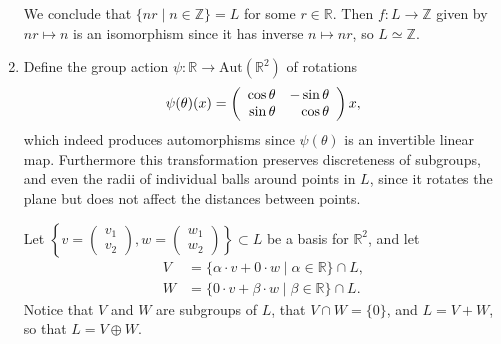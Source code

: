\documentclass{article}
\begin{document}
\begin{Answer}
\begin{enumerate}
{      We conclude that $\{ n r \mid n \in \mathbb{Z} \} = L$ for some
      $r \in \mathbb{R}$. Then $f : L \to \mathbb{Z}$ given by
      $n r \mapsto n$ is an isomorphism since it has inverse
      $n \mapsto n r$, so $L \simeq \mathbb{Z}$.
    }
    \item{
      Define the group action
      $\psi : \mathbb{R} \to \mathrm{Aut}(\mathbb{R}^2)$
      of rotations
      $$
      \psi(\theta)(x) =
        \left(\begin{array}{r r}
          \cos \theta & -\sin \theta \\
          \sin \theta &  \cos \theta
        \end{array}\right) x,
      $$
      which indeed produces automorphisms since
      $\psi(\theta)$ is an invertible linear map.
      Furthermore this transformation preserves discreteness of
      subgroups, and even the radii of individual balls around points
      in $L$, since it rotates the plane but does not affect the
      distances between points.

      Let
      $\left\{
           v = \left(\begin{array}{c}
                 v_1 \\ v_2
               \end{array}\right)
         , w = \left(\begin{array}{c}
                 w_1 \\ w_2
               \end{array}\right)
       \right\} \subset L$ be a basis for
      $\mathbb{R}^2$, and let
      \begin{align*}
      V &= \{ \alpha \cdot v + 0     \cdot w
             \mid \alpha \in \mathbb{R}
           \} \cap L, \\
      W &= \{ 0      \cdot v + \beta \cdot w
             \mid \beta \in \mathbb{R}
          \} \cap L.
      \end{align*}
      Notice that $V$ and $W$ are subgroups of $L$,
      that $V \cap W = \{ 0 \}$, and $L = V + W$, so that
      $L = V \oplus W$.

}
\end{enumerate}
\end{Answer}
\end{document}
